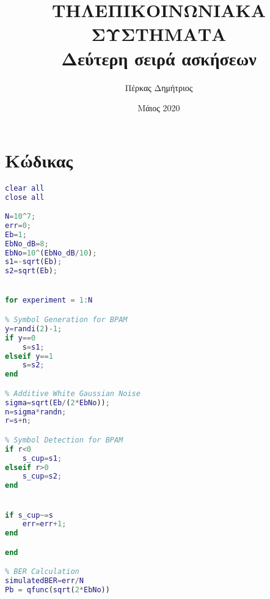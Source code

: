\documentclass{article}
\begin{document}
\title{ΤΗΛΕΠΙΚΟΙΝΩΝΙΑΚΑ ΣΥΣΤΗΜΑΤΑ \\ Δεύτερη σειρά ασκήσεων}
\author{Πέρκας Δημήτριος}
\date{Μάιος 2020}

\maketitle

\pagebreak


\tableofcontents
\newpage





\section{Κώδικας }

\begin{otherlanguage}{english}
\begin{lstlisting}[language=MATLAB, caption= BER In BPAM Modulation ]
%PERKAS DIMITRIOS 4156
clear all 
close all

N=10^7;
err=0;
Eb=1;
EbNo_dB=8;
EbNo=10^(EbNo_dB/10);
s1=-sqrt(Eb);
s2=sqrt(Eb);


for experiment = 1:N

% Symbol Generation for BPAM
y=randi(2)-1;
if y==0
    s=s1;
elseif y==1 
    s=s2;
end

% Additive White Gaussian Noise     
sigma=sqrt(Eb/(2*EbNo));
n=sigma*randn;
r=s+n;

% Symbol Detection for BPAM
if r<0
    s_cup=s1;
elseif r>0
    s_cup=s2;
end


if s_cup~=s
    err=err+1;
end

end

% BER Calculation
simulatedBER=err/N
Pb = qfunc(sqrt(2*EbNo))
\end{lstlisting}
\end{otherlanguage}




\end{document}
